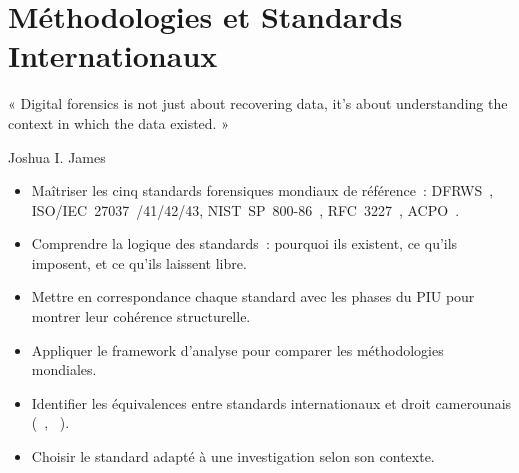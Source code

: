 
\chapter{Méthodologies et Standards Internationaux}
\label{chap:meth-std}

\epigraph{%
    « Digital forensics is not just about recovering data, it's about
    understanding the context in which the data existed. »%
}{Joshua I. James}


\begin{boxobjectifs}
\begin{itemize}
    \item Maîtriser les cinq standards forensiques mondiaux de référence~:
          DFRWS~\cite{dfrws2001}, ISO/IEC~27037~\cite{iso27037}/41/42/43, NIST~SP~800-86~\cite{nist80086}, RFC~3227~\cite{rfc3227}, ACPO~\cite{acpo2012}.
    \item Comprendre la logique des standards~: pourquoi ils existent,
          ce qu'ils imposent, et ce qu'ils laissent libre.
    \item Mettre en correspondance chaque standard avec les phases du PIU
          pour montrer leur cohérence structurelle.
    \item Appliquer le framework d'analyse  pour comparer
          les méthodologies mondiales.
    \item Identifier les équivalences entre standards internationaux et
          droit camerounais (~\cite{cameroun2010a}, ~\cite{cameroun2024donnees}).
    \item Choisir le standard adapté à une investigation selon son contexte.
\end{itemize}
\end{boxobjectifs}

\bigskip

